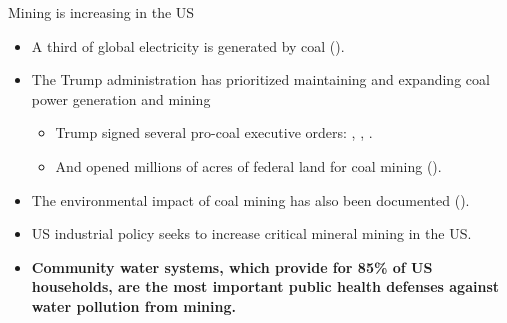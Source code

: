 \documentclass{beamer}
\begin{document}
\begin{frame}{Mining is increasing in the US}
    \begin{itemize} 
        \item A third of global electricity is generated by coal (\cite{IEA2025GER}).
        \item The Trump administration has prioritized maintaining and expanding coal power generation and mining
        \begin{itemize}
            \item Trump signed several pro-coal executive orders: \cite{Trump2025EO14260}, \cite{Trump2025EO14261}, \cite{Trump2025Proc10914}.
            \item And opened millions of acres of federal land for coal mining (\cite{Daly2025CoalMining}).
        \end{itemize}
        \item The environmental impact of coal mining has also been documented (\cite{muller2011environmental}).
        \item US industrial policy seeks to increase critical mineral mining in the US.
        \item \textbf{Community water systems, which provide for 85\% of US households, are the most important public health defenses against water pollution from mining.}
    \end{itemize}
\end{frame}
\end{document}
